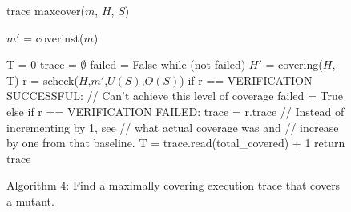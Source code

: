 \documentclass[conference]{IEEEtran}
\begin{document}
\begin{figure}
{\scriptsize 
\begin{code}
trace maxcover($m$, $H$, $S$) 
\vspace{0.1in}

$m'$ = coverinst($m$)

T = 0
trace = $\emptyset$
failed = False
while (not failed)
   $H'$ = covering($H$, T)
   r = scheck($H$,$m'$,$U(S)$,$O(S)$)
   if r == VERIFICATION SUCCESSFUL:
     // Can't achieve this level of coverage
     failed = True
   else if r == VERIFICATION FAILED:
     trace = r.trace
     // Instead of incrementing by 1, see
     // what actual coverage was and
     // increase by one from that baseline.
     T = trace.read(total\_covered) + 1
return trace
\end{code}
}
\caption{Algorithm 4: Find a maximally covering execution trace that
  covers a mutant.}
\label{alg:maxcover}
\end{figure}
\end{document}
